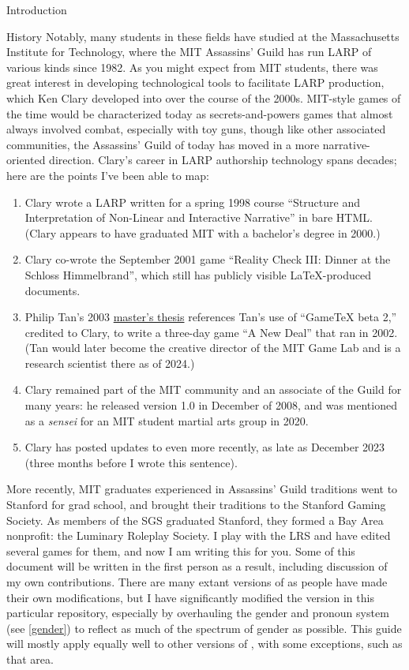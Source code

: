 \documentclass[sheet]{GameTexBase}
\begin{document}
\begin{section}{Introduction}
\begin{subsection}{History}
Notably, many students in these fields have studied at the Massachusetts Institute for Technology, where the MIT Assassins' Guild has run LARP of various kinds since 1982.
As you might expect from MIT students, there was great interest in developing technological tools to facilitate LARP production, which Ken Clary developed into \gametex{} over the course of the 2000s.
MIT-style games of the time would be characterized today as secrets-and-powers games that almost always involved combat, especially with toy guns, though like other associated communities, the Assassins' Guild of today
has moved in a more narrative-oriented direction.
Clary's career in LARP authorship technology spans decades; here are the points I've been able to map:
\begin{enumerate}
\item Clary wrote a LARP written for a spring 1998 course ``Structure and Interpretation of Non-Linear and Interactive Narrative'' in bare HTML.  (Clary appears to have graduated MIT with a bachelor's degree in 2000.)
\item Clary co-wrote the September 2001 game  ``Reality Check III: Dinner at the Schloss Himmelbrand'', which still has publicly visible \LaTeX{}-produced documents.
\item Philip Tan's 2003 \href{https://drive.google.com/file/d/1RiGc2OWtXIPlebHVrixv2IpAbSGAThtd/view?usp=sharing}{master's thesis} references Tan's use of ``GameTeX beta 2,'' credited to Clary, to write a three-day game ``A New Deal'' that ran in 2002.  (Tan would later become the creative director of the MIT Game Lab and is a research scientist there as of 2024.)
\item Clary remained part of the MIT community and an associate of the Guild for many years: he released \gametex{} version 1.0 in December of 2008, and was mentioned as a \emph{sensei} for an MIT student martial arts group in 2020.
\item Clary has posted updates to \gametex{} even more recently, as late as December 2023 (three months before I wrote this sentence).
\end{enumerate}
More recently, MIT graduates experienced in Assassins' Guild traditions went to Stanford for grad school, and brought their traditions to the Stanford Gaming Society.  As members of the SGS graduated Stanford, 
they formed a Bay Area nonprofit: the Luminary Roleplay Society.  I play with the LRS and have edited several games for them, and now I am writing this for you.  Some of this document will be written in the first person as a result, including discussion of my own contributions.  There are many extant versions of \gametex{} as people have made their own modifications, but I have significantly modified the version in this particular repository, especially by overhauling the gender and pronoun system (see \ref{gender}) to reflect as much of the spectrum of gender as possible.  This guide will mostly apply equally well to other versions of \gametex{}, with some exceptions, such as that area.

\end{subsection}
\end{section}
\end{document}
